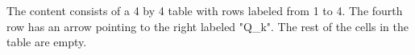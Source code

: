 The content consists of a 4 by 4 table with rows labeled from 1 to 4. The fourth row has an arrow pointing to the right labeled "Q_k". The rest of the cells in the table are empty.